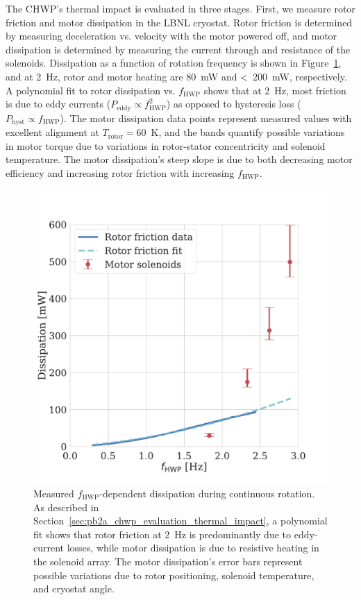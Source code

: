 The CHWP's thermal impact is evaluated in three stages. First, we measure rotor friction and motor dissipation in the LBNL cryostat. Rotor friction is determined by measuring deceleration vs. velocity with the motor powered off, and motor dissipation is determined by measuring the current through and resistance of the solenoids. Dissipation as a function of rotation frequency is shown in Figure~\ref{fig:rot_pow_diss}, and at 2~Hz, rotor and motor heating are 80~mW and <~200~mW, respectively. A polynomial fit to rotor dissipation vs. $f_{\mathrm{HWP}}$ shows that at 2~Hz, most friction is due to eddy currents ($P_{\mathrm{eddy}} \propto f_{\mathrm{HWP}}^{2}$) as opposed to hysteresis loss ($P_{\mathrm{hyst}} \propto f_{\mathrm{HWP}}$). The motor dissipation data points represent measured values with excellent alignment at $T_{\mathrm{rotor}} = 60$~K, and the bands quantify possible variations in motor torque due to variations in rotor-stator concentricity and solenoid temperature. The motor dissipation's steep slope is due to both decreasing motor efficiency and increasing rotor friction with increasing $f_{\mathrm{HWP}}$.

\begin{figure}[!t]
    \centering
    \includegraphics[width=0.6\linewidth, trim=0.4cm 1.2cm 2.3cm 3.2cm, clip]{CHWPEvaluation/Figures/rotor_motor_dissipation.pdf}
    \caption{Measured $f_{\mathrm{HWP}}$-dependent dissipation during continuous rotation. As described in Section~\ref{sec:pb2a_chwp_evaluation_thermal_impact}, a polynomial fit shows that rotor friction at 2~Hz is predominantly due to eddy-current losses, while motor dissipation is due to resistive heating in the solenoid array. The motor dissipation's error bars represent possible variations due to rotor positioning, solenoid temperature, and cryostat angle.}
    \label{fig:rot_pow_diss}
\end{figure}

